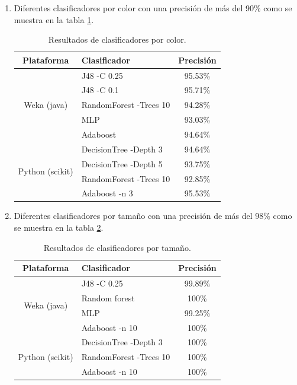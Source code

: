 \documentclass[twoside,spanish,ESP,MSc]{plantillaLabUPV}
\theoremstyle{definition}
\begin{document}
\begin{enumerate}
\begin{enumerate}
	\item Diferentes clasificadores por color con una precisión de más del 90\% como se muestra en la tabla \ref{menosr}.
	
	\begin{table}[!h]
		\centering
		\caption{Resultados de clasificadores por color.}
		\label{menosr}
		\begin{tabular}{|c|l|c|}
			\hline
			\textbf{Plataforma}              & \textbf{Clasificador}  & \textbf{Precisión} \\ \hline
			\multirow{5}{*}{Weka (java)}     & J48 -C 0.25            & 95.53\%            \\ \cline{2-3} 
			& J48 -C 0.1             & 95.71\%            \\ \cline{2-3} 
			& RandomForest -Trees 10 & 94.28\%            \\ \cline{2-3} 
			& MLP                    & 93.03\%            \\ \cline{2-3} 
			& Adaboost               & 94.64\%            \\ \hline
			\multirow{5}{*}{Python (scikit)} & DecisionTree -Depth 3  & 94.64\%            \\ \cline{2-3} 
			& DecisionTree -Depth 5  & 93.75\%            \\ \cline{2-3} 
			& RandomForest -Trees 10 & 92.85\%  \\ \cline{2-3}  
			& Adaboost -n 3          & 95.53\%            \\ \hline
		\end{tabular}
	\end{table}
	
	
	\item Diferentes clasificadores por tamaño con una precisión de más del 98\% como se muestra en la tabla \ref{resuAr}.
	
	\begin{table}[!h]
		\centering
		\caption{Resultados de clasificadores por tamaño.}
		\label{resuAr}
		\begin{tabular}{|c|l|c|}
			\hline
			\textbf{Plataforma}              & \textbf{Clasificador}  & \textbf{Precisión} \\ \hline
			\multirow{4}{*}{Weka (java)}     & J48 -C 0.25            & 99.89\%            \\ \cline{2-3} 
			& Random forest          & 100\%              \\ \cline{2-3}
			& MLP                    & 99.25\%            \\ \cline{2-3}
			& Adaboost -n 10         & 100\%              \\ \hline
			\multirow{4}{*}{Python (scikit)} & DecisionTree -Depth 3  & 100\%              \\ \cline{2-3} 
			& RandomForest -Trees 10 & 100\%              \\ \cline{2-3}
			& Adaboost -n 10         & 100\%              \\ \hline
		\end{tabular}
	\end{table}
	

\end{enumerate}
\end{enumerate}
\end{document}
